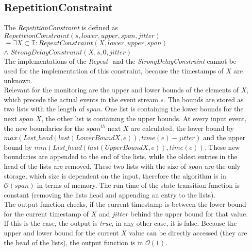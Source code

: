 \subsection{RepetitionConstraint}
	The  \emph{RepetitionConstraint} is defined as\\[10pt]
		$RepetitionConstraint(s, lower, upper, span, jitter)$\\
		$\equiv \exists X\subset \mathbb{T}: RepeatConstraint (X, lower, upper, span)$\\
		\hspace{7cm}$\land$ $StrongDelayConstraint(X, s, 0, jitter)$\\[10pt]
	The implementations of the \emph{Repeat-} and the \emph{StrongDelayConstraint} cannot be used for the implementation of this constraint, because the timestamps of $X$ are unknown.\\
	Relevant for the monitoring are the upper and lower bounds of the elements of $X$, which precede the actual events in the event stream $s$. The bounds are stored as two lists with the length of $span$. One list is containing the lower bounds for the next $span$ $X$, the other list is containing the upper bounds. At every input event, the new boundaries for the $span^{th}$ next $X$ are calculated, the lower bound by $max(List\_head(last(LowerBoundX, e)), time(e)-jitter)$ and the upper bound by $min(List\_head(last(UpperBoundX, e)), time(e))$. These new boundaries are appended to the end of the lists, while the oldest entries in the head of the lists are removed. These two lists with the size of $span$ are the only storage, which size is dependent on the input, therefore the algorithm is in $\mathcal{O}(span)$ in terms of memory. The run time of the state transition function is constant (removing the lists head and appending an entry to the lists).\\
	The output function checks, if the current timestamp is between the lower bound for the current timestamp of $X$ and $jitter$ behind the upper bound for that value. If this is the case, the output is \emph{true}, in any other case, it is false. Because the upper and lower bound for the current $X$ value can be directly accessed (they are the head of the lists), the output function is in $\mathcal{O}(1)$.
	
